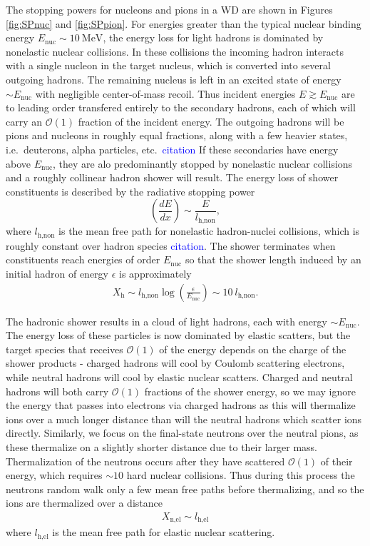 \documentclass[twocolumn,showpacs,preprintnumbers,amsmath,amssymb,prd]{revtex4}
\newcommand{\OO}{\mathcal{O}}
\def\r{\right)}
\def\l{\left(}
\begin{document}
The stopping powers for nucleons and pions in a WD are shown in Figures \ref{fig:SPnuc} and \ref{fig:SPpion}.
For energies greater than the typical nuclear binding energy $E_\text{nuc} \sim 10 ~\text{MeV}$, the energy loss for light hadrons is dominated by nonelastic nuclear collisions. 
In these collisions the incoming hadron interacts with a single nucleon in the target nucleus, which is converted into several outgoing hadrons.
The remaining nucleus is left in an excited state of energy $\sim E_\text{nuc}$ with negligible center-of-mass recoil. 
Thus incident energies $E \gtrsim E_\text{nuc}$ are to leading order transfered entirely to the secondary hadrons, each of which will carry an $\OO(1)$ fraction of the incident energy.
The outgoing hadrons will be pions and nucleons in roughly equal fractions, along with a few heavier states, i.e.\ deuterons, alpha particles, etc.\ \textcolor{blue}{citation}
If these secondaries have energy above $E_\text{nuc}$, they are alo predominantly stopped by nonelastic nuclear collisions and a roughly collinear hadron shower will result. 
The energy loss of shower constituents is described by the radiative stopping power
\begin{equation}
  \l \frac{dE}{dx} \r \sim \frac{E}{l_\text{h,non}},
\end{equation}
where $l_\text{h,non}$ is the mean free path for nonelastic hadron-nuclei collisions, which is roughly constant over hadron species \textcolor{blue}{citation}.
The shower terminates when constituents reach energies of order $E_\text{nuc}$ so that the shower length induced by an initial hadron of energy $\epsilon$ is approximately 
\begin{align}
\label{eq:hadlength}
  X_\text{h} \sim l_\text{h,non} \log\l\frac{\epsilon}{E_\text{nuc}}\r 
  \sim 10 ~l_\text{h,non}. 
\end{align}

The hadronic shower results in a cloud of light hadrons, each with energy $\sim E_\text{nuc}$. 
The energy loss of these particles is now dominated by elastic scatters, but the target species that receives $\OO(1)$ of the energy depends on the charge of the shower products - charged hadrons will cool by Coulomb scattering electrons, while neutral hadrons will cool by elastic nuclear scatters. 
Charged and neutral hadrons will both carry $\OO(1)$ fractions of the shower energy, so we may ignore the energy that passes into electrons via charged hadrons as this will thermalize ions over a much longer distance than will the neutral hadrons which scatter ions directly. 
Similarly, we focus on the final-state neutrons over the neutral pions, as these thermalize on a slightly shorter distance due to their larger mass. 
Thermalization of the neutrons occurs after they have scattered $\OO(1)$ of their energy, which requires $\sim 10$ hard nuclear collisions. 
Thus during this process the neutrons random walk only a few mean free paths before thermalizing, and so the ions are thermalized over a distance
\begin{align}
  X_\text{n,el} \sim l_\text{h,el}  
\end{align}
where $ l_\text{h,el}$ is the mean free path for elastic nuclear scattering. 
\end{document}
